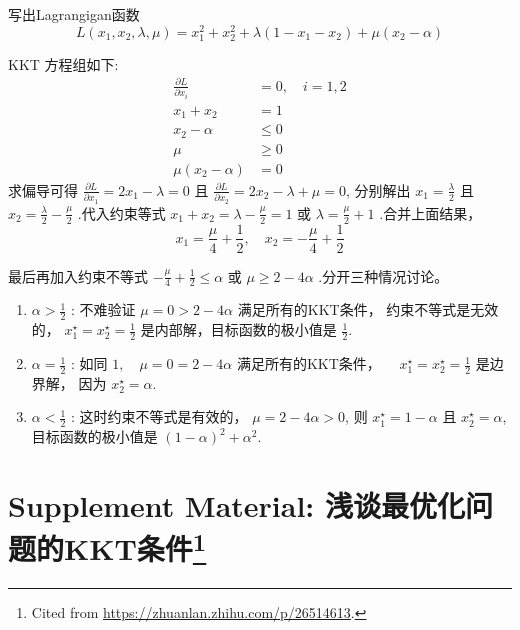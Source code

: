写出Lagrangigan函数
\begin{equation}
L\left(x_{1}, x_{2}, \lambda, \mu\right)=x_{1}^{2}+x_{2}^{2}+\lambda\left(1-x_{1}-x_{2}\right)+\mu\left(x_{2}-\alpha\right)
\end{equation}

KKT 方程组如下:
\begin{equation}
\begin{aligned}
\frac{\partial L}{\partial x_{i}} &=0, \quad i=1,2 \\
x_{1}+x_{2} &=1 \\
x_{2}-\alpha & \leq 0 \\
\mu & \geq 0 \\
\mu\left(x_{2}-\alpha\right) &=0
\end{aligned}
\end{equation}
求偏导可得 $ \frac{\partial L}{\partial x_{1}}=2 x_{1}-\lambda=0 $ 且 $ \frac{\partial L}{\partial x_{2}}=2 x_{2}-\lambda+\mu=0 $, 分别解出 $ x_{1}=\frac{\lambda}{2} $ 且 $ x_{2}=\frac{\lambda}{2}-\frac{\mu}{2} $ .代入约束等式 $ x_{1}+x_{2}=\lambda-\frac{\mu}{2}=1 $ 或 $ \lambda=\frac{\mu}{2}+1 $ .合并上面结果，
\begin{equation}
x_{1}=\frac{\mu}{4}+\frac{1}{2}, \quad x_{2}=-\frac{\mu}{4}+\frac{1}{2}
\end{equation}

最后再加入约束不等式 $ -\frac{\mu}{4}+\frac{1}{2} \leq \alpha $ 或 $ \mu \geq 2-4 \alpha $ .分开三种情况讨论。

\begin{enumerate}
    \item $ \alpha>\frac{1}{2} $ : 不难验证 $ \mu=0>2-4 \alpha $ 满足所有的KKT条件， 约束不等式是无效的， $ x_{1}^{\star}=x_{2}^{\star}=\frac{1}{2} $ 是内部解，目标函数的极小值是 $ \frac{1}{2}$.
    \item $ \alpha=\frac{1}{2} $ : 如同 $ 1, \quad \mu=0=2-4 \alpha $ 满足所有的KKT条件， $ \quad x_{1}^{\star}=x_{2}^{\star}=\frac{1}{2} $ 是边界解， 因为 $ x_{2}^{\star}=\alpha $.
    \item $ \alpha<\frac{1}{2} $ : 这时约束不等式是有效的， $ \mu=2-4 \alpha>0 $, 则 $ x_{1}^{\star}=1-\alpha $ 且 $ x_{2}^{\star}=\alpha $, 目标函数的极小值是 $ (1-\alpha)^{2}+\alpha^{2} $.
\end{enumerate}

\section[Supplement Material: 浅谈最优化问题的KKT条件]{Supplement Material: 浅谈最优化问题的KKT条件\footnote{Cited from \url{https://zhuanlan.zhihu.com/p/26514613}.}}


